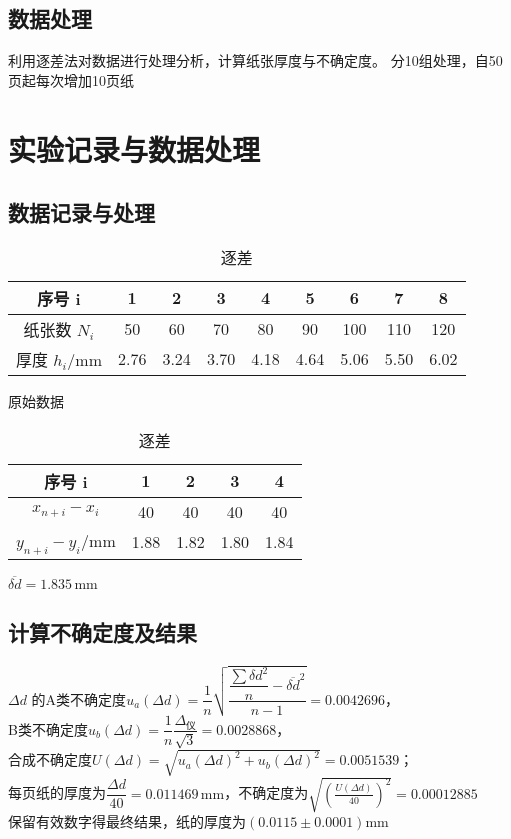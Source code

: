 \documentclass{jiwu}
\begin{document}
\subsection{数据处理}
利用逐差法对数据进行处理分析，计算纸张厚度与不确定度。
分10组处理，自50页起每次增加10页纸
\section{实验记录与数据处理}
\subsection{数据记录与处理}
\begin{table}[hbtp]
    \centering
\begin{tabular}{|c|c|c|c|c|c|c|c|c|}
    \hline
    序号 i&1&2&3&4&5&6&7&8\\
    \hline
    纸张数 $N_i$&50&60&70&80&90&100&110&120\\
    \hline
    厚度 $h_i$/mm&2.76&3.24&3.70&4.18&4.64&5.06&5.50&6.02\\
    \hline
\end{tabular}
\caption{原始数据}
\begin{center}
    \begin{tabular}{|c|c|c|c|c|}
        \hline
        序号 i&1&2&3&4\\
        \hline
        $x_{n+i}-x_i$&40&40&40&40\\
        \hline
        $y_{n+i}-y_i$/mm&1.88&1.82&1.80&1.84\\
        \hline
    \end{tabular}
    \end{center}
    \caption{逐差}
\end{table}


$
    \overline{\delta d}=1.835\,\text{mm}
$
\subsection{计算不确定度及结果}
$\Delta d$ 的A类不确定度$u_a(\Delta d)=\dfrac{1}{n}\sqrt{\dfrac{\dfrac{\sum\delta d^2}{n}-\overline{\delta d}^2}{n-1}}=0.0042696$，\\[0.5em]

B类不确定度$u_b(\Delta d)=\dfrac{1}{n}\dfrac{\Delta_\text{仪}}{\sqrt{3}}=0.0028868$，\\[0.5em]

合成不确定度$U(\Delta d)=\sqrt{u_a(\Delta d)^2+u_b(\Delta d)^2}=0.0051539$；\\[0.5em]

每页纸的厚度为$\dfrac{\Delta d}{40}=0.011469\,\text{mm}$，不确定度为$\sqrt{(\frac{U(\Delta d)}{40})^2}=0.00012885$\\[0.5em]

保留有效数字得最终结果，纸的厚度为$(0.0115\pm0.0001)$mm
\end{document}
